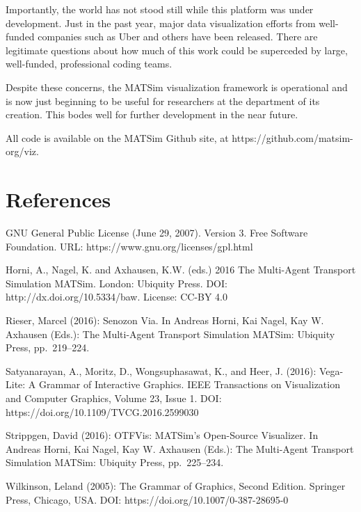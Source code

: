 Importantly, the world has not stood still while this platform was under development. Just in the past year, major data visualization efforts from well-funded companies such as Uber and others have been released. There are legitimate questions about how much of this work could be superceded by large, well-funded, professional coding teams.

Despite these concerns, the MATSim visualization framework is operational and is now just beginning to be useful for researchers at the department of its creation. This bodes well for further development in the near future.

All code is available on the MATSim Github site, at https://github.com/matsim-org/viz.

\hypertarget{references}{%
\section{References}\label{references}}

GNU General Public License (June 29, 2007). Version 3. Free Software
Foundation. URL: https://www.gnu.org/licenses/gpl.html

Horni, A., Nagel, K. and Axhausen, K.W. (eds.) 2016 The Multi-Agent
Transport Simulation MATSim. London: Ubiquity Press. DOI:
http://dx.doi.org/10.5334/baw. License: CC-BY 4.0

Rieser, Marcel (2016): Senozon Via. In Andreas Horni, Kai Nagel, Kay W.
Axhausen (Eds.): The Multi-Agent Transport Simulation MATSim: Ubiquity
Press, pp.~219--224.

Satyanarayan, A., Moritz, D., Wongsuphasawat, K., and Heer, J. (2016):
Vega-Lite: A Grammar of Interactive Graphics. IEEE Transactions on
Visualization and Computer Graphics, Volume 23, Issue 1. DOI:
https://doi.org/10.1109/TVCG.2016.2599030

Strippgen, David (2016): OTFVis: MATSim's Open-Source Visualizer. In
Andreas Horni, Kai Nagel, Kay W. Axhausen (Eds.): The Multi-Agent
Transport Simulation MATSim: Ubiquity Press, pp.~225--234.

Wilkinson, Leland (2005): The Grammar of Graphics, Second Edition.
Springer Press, Chicago, USA. DOI: https://doi.org/10.1007/0-387-28695-0
